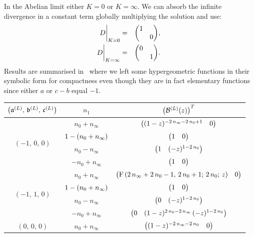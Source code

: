 In the Abelian limit either $K = 0$ or $K = \infty$.
We can absorb the infinite divergence in a constant term globally multiplying the solution and use:
\begin{eqnarray}
  \eval{D}_{K = 0} & = & \mqty( 1 & \\ & 0 ),
  \\
  \eval{D}_{K = \infty} & = & \mqty( 0 & \\ & 1 ).
\end{eqnarray}
Results are summarised in~ where we left some hypergeometric functions in their symbolic form for compactness even though they are in fact elementary functions since either $a$ or $c - b$ equal $-1$.
\begin{table}[tbp]
  \centering
  \begin{tabular}{@{}ccc@{}}
    \toprule
    $\qty( \mathfrak{a}^{(L)},\, \mathfrak{b}^{(L)},\, \mathfrak{c}^{(L)} )$ &
    $n_{1}$                                            &
    $\qty( \mathcal{B}^{(L)}( z ) )^T$
    \\
    \midrule
    \multirow{4}{*}{$(-1,\, 0,\, 0)$} &
    $n_{0} + n_{\infty}$    &
    $\mqty( (1 - z)^{-2\, n_{\infty} - 2\, n_{0} + 1} & 0 )$
    \\
                                                      &
    $1 - \qty( n_{0} + n_{\infty} )$ &
    $\mqty( 1 & 0 )$
    \\
                                   &
    $n_{0} - n_{\infty}$ &
    $\mqty( 1 & (-z)^{1 - 2\, n_{0}} )$
    \\
                                     &
    $- n_{0} + n_{\infty}$ &
    $\mqty( 1 & 0 )$
    \\
    \midrule
    \multirow{4}{*}{$(-1,\, 1,\, 0)$} &
    $n_{0} + n_{\infty}$    &
    $\mqty( \hyp{2\, n_{\infty} + 2\, n_{0} - 1}
                {2\, n_{0} + 1}
                {2\, n_{0}}
                {z}
            & 0 )$
    \\
                                                      &
    $1 - \qty( n_{0} + n_{\infty} )$ &
    $\mqty( 1 & 0 )$
    \\
                                   &
    $n_{0} - n_{\infty}$ &
    $\mqty( 0 & (-z)^{1 - 2\, n_{0}} )$
    \\
                                     &
    $- n_{0} + n_{\infty}$ &
    $\mqty( 0 & (1-z)^{2\, n_{0} - 2\, n_{\infty}}\, (-z)^{1 - 2\, n_{0}} )$
    \\
    \midrule
    \multirow{4}{*}{$(0,\, 0,\, 0)$} &
    $n_{0} + n_{\infty}$    &
    $\mqty( (1-z)^{-2\, n_{\infty} - 2\, n_{0}} & 0 )$

\end{tabular}
\end{table}
